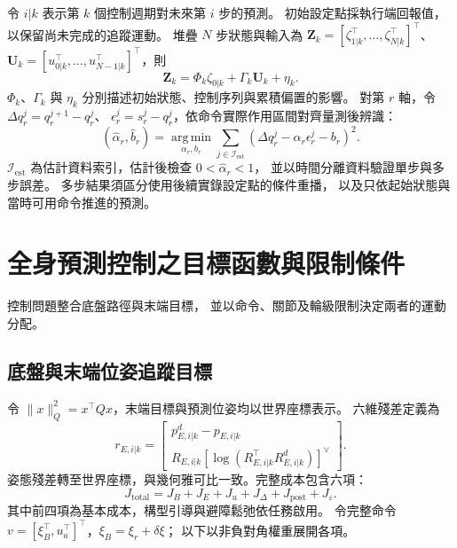 令 $i|k$ 表示第 $k$ 個控制週期對未來第 $i$ 步的預測。
初始設定點採執行端回報值，以保留尚未完成的追蹤運動。
堆疊 $N$ 步狀態與輸入為
$\mathbf Z_k=[\zeta_{1|k}^\top,\ldots,\zeta_{N|k}^\top]^\top$、
$\mathbf U_k=[u_{0|k}^\top,\ldots,u_{N-1|k}^\top]^\top$，則
\begin{equation}
    \mathbf Z_k=\Phi_k\zeta_{0|k}+\Gamma_k\mathbf U_k+\eta_k .
    \label{eq:ch3_condensed_augmented_prediction}
\end{equation}
$\Phi_k$、$\Gamma_k$ 與 $\eta_k$ 分別描述初始狀態、控制序列與累積偏置的影響。
對第 $r$ 軸，令 $\Delta q_r^j=q_r^{j+1}-q_r^j$、
$\epsilon_r^j=s_r^j-q_r^j$，依命令實際作用區間對齊量測後辨識：
\begin{equation}
    (\hat\alpha_r,\hat b_r)=
    \underset{\alpha_r,b_r}{\operatorname{arg\,min}}
    \sum_{j\in\mathcal I_{\mathrm{est}}}
    \left(\Delta q_r^j-\alpha_r\epsilon_r^j-b_r\right)^2.
    \label{eq:ch3_arm_parameter_identification}
\end{equation}
$\mathcal I_{\mathrm{est}}$ 為估計資料索引，估計後檢查 $0<\hat\alpha_r<1$，
並以時間分離資料驗證單步與多步誤差。
多步結果須區分使用後續實錄設定點的條件重播，
以及只依起始狀態與當時可用命令推進的預測。

\section{全身預測控制之目標函數與限制條件}
\label{sec:wholebody_objective_constraints}

控制問題整合底盤路徑與末端目標，
並以命令、關節及輪級限制決定兩者的運動分配。

\subsection{底盤與末端位姿追蹤目標}
\label{subsec:wholebody_tracking_objective}

令 $\|x\|_Q^2=x^\top Qx$，末端目標與預測位姿均以世界座標表示。
六維殘差定義為
\begin{equation}
    r_{E,i|k}=
    \begin{bmatrix}
        p_{E,i|k}^{d}-p_{E,i|k}\\
        R_{E,i|k}
        [\log(R_{E,i|k}^{\top}R_{E,i|k}^{d})]^\vee
    \end{bmatrix}.
    \label{eq:ch3_tcp_pose_residual}
\end{equation}
姿態殘差轉至世界座標，與幾何雅可比一致。完整成本包含六項：
\begin{equation}
    J_{\mathrm{total}}
    =J_B+J_E+J_u+J_\Delta+J_{\mathrm{post}}+J_\varepsilon .
    \label{eq:ch3_wholebody_objective}
\end{equation}
其中前四項為基本成本，構型引導與避障鬆弛依任務啟用。
令完整命令 $v=[\xi_B^\top,u_a^\top]^\top$，$\xi_B=\xi_r+\delta\xi$；
以下以非負對角權重展開各項。

